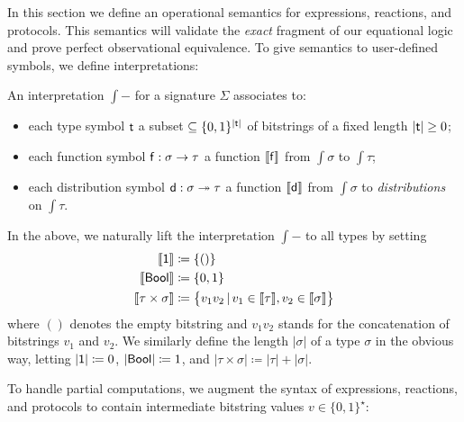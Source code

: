 In this section we define an operational semantics for \ipdl expressions, reactions, and protocols. This semantics will validate the \emph{exact} fragment of our equational logic and prove perfect observational equivalence. To give semantics to user-defined symbols, we define interpretations:

\begin{definition}[Interpretation]
An interpretation $\int{-}$ for a signature $\Sigma$ associates to:
\begin{itemize}
\item each type symbol $\mathsf{t}$ a subset $\subseteq \{0,1\}^{|\mathsf{t}|}$ of bitstrings of a fixed length $|\mathsf{t}| \geq 0$;
\item each function symbol $\mathsf{f} : \sigma \to \tau$ a function $\llbracket \mathsf{f} \rrbracket$ from $\int{\sigma}$ to $\int{\tau}$;
\item each distribution symbol $\mathsf{d} : \sigma \twoheadrightarrow \tau$ a function $\llbracket \mathsf{d} \rrbracket$ from $\int{\sigma}$ to \emph{distributions} on $\int{\tau}$.
\end{itemize}
\end{definition}
\noindent In the above, we naturally lift the interpretation $\int{-}$ to all types by setting
\begin{align*}
\llbracket \mathsf{1} \rrbracket & \coloneqq \{()\} \\
\llbracket \mathsf{Bool} \rrbracket & \coloneqq \{0,1\} \\
\llbracket \tau \times \sigma \rrbracket & \coloneqq \big\{v_1 v_2 \, | \, v_1 \in \llbracket \tau \rrbracket, v_2 \in \llbracket \sigma \rrbracket\big\}
\end{align*}
where $()$ denotes the empty bitstring and $v_1 v_2$ stands for the concatenation of bitstrings $v_1$ and $v_2$. We similarly define the length $|\sigma|$ of a type $\sigma$ in the obvious way, letting $|\mathsf{1}| \coloneqq 0$, $|\mathsf{Bool}| \coloneqq 1$, and $|\tau \times \sigma| \coloneqq |\tau| + |\sigma|$.

To handle partial computations, we augment the syntax of \ipdl expressions, reactions, and protocols to contain intermediate bitstring values $v \in \{0,1\}^\star$:\smallskip

\begin{syntax}
 \alternative{\dots}
 \alternative{\dots}
 \alternative{\dots}
\end{syntax}\smallskip

